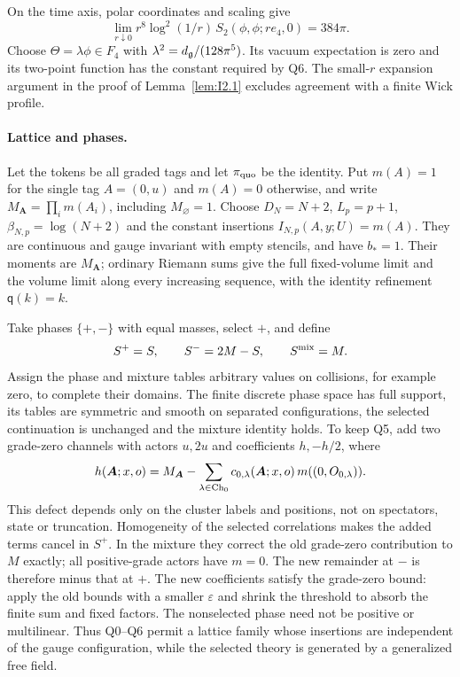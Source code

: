 On the time axis, polar coordinates and scaling give
\begin{equation*}
\lim_{r\downarrow0}r^8\log^2(1/r)\,S_2(\phi,\phi;re_4,0)=384\pi.
\end{equation*}
Choose $\Theta=\lambda\phi\in F_4$ with $\lambda^2=d_{\mathfrak{g}}/(128\pi^5)$. Its vacuum expectation is zero and its two-point function has the constant required by Q6. The small-$r$ expansion argument in the proof of Lemma~\ref{lem:I2.1} excludes agreement with a finite Wick profile.

\paragraph{Lattice and phases.} Let the tokens be all graded tags and let $\pi_{\rm quo}$ be the identity. Put $m(A)=1$ for the single tag $A=(0,u)$ and $m(A)=0$ otherwise, and write $M_{\boldsymbol A}=\prod_i m(A_i)$, including $M_\varnothing=1$. Choose $D_N=N+2$, $L_p=p+1$, $\beta_{N,p}=\log(N+2)$ and the constant insertions $I_{N,p}(A,y;U)=m(A)$. They are continuous and gauge invariant with empty stencils, and have $b_*=1$. Their moments are $M_{\boldsymbol A}$; ordinary Riemann sums give the full fixed-volume limit and the volume limit along every increasing sequence, with the identity refinement $\mathsf q(k)=k$.

Take phases $\{+,-\}$ with equal masses, select $+$, and define
\begin{equation*}
S^+=S,\qquad S^-=2M-S,\qquad S^{\rm mix}=M.
\end{equation*}
Assign the phase and mixture tables arbitrary values on collisions, for example zero, to complete their domains. The finite discrete phase space has full support, its tables are symmetric and smooth on separated configurations, the selected continuation is unchanged and the mixture identity holds. To keep Q5, add two grade-zero channels with actors $u,2u$ and coefficients $h,-h/2$, where
\begin{equation*}
h(\boldsymbol A;x,o)=M_{\boldsymbol A}-\sum_{\lambda\in\mathrm{Ch}_{0}}c_{0,\lambda}(\boldsymbol A;x,o)\,m((0,O_{0,\lambda})).
\end{equation*}
This defect depends only on the cluster labels and positions, not on spectators, state or truncation. Homogeneity of the selected correlations makes the added terms cancel in $S^+$. In the mixture they correct the old grade-zero contribution to $M$ exactly; all positive-grade actors have $m=0$. The new remainder at $-$ is therefore minus that at $+$. The new coefficients satisfy the grade-zero bound: apply the old bounds with a smaller $\varepsilon$ and shrink the threshold to absorb the finite sum and fixed factors. The nonselected phase need not be positive or multilinear. Thus Q0--Q6 permit a lattice family whose insertions are independent of the gauge configuration, while the selected theory is generated by a generalized free field.



